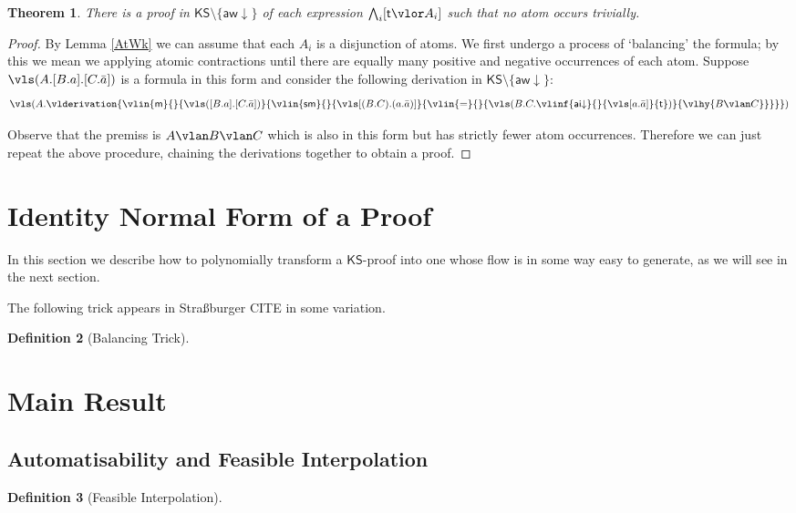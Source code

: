 \documentclass[a4paper]{amsart}
\newtheorem{theorem}{Theorem}
\theoremstyle{definition}
\newtheorem{definition}[theorem]{Definition}
\newcommand{\ttt}{\mathsf t}
\newcommand{\ai  }{\mathsf{ai}}
\newcommand{\aw  }{\mathsf{aw}}
\newcommand{\aid }{{\ai{\downarrow}}}
\newcommand{\awd }{{\aw{\downarrow}}}
\newcommand{\med }{\mathsf{m}}
\newcommand{\smix }{\mathsf{sm}}
\newcommand{\KS}{\mathsf{KS}}
\begin{document}
\begin{theorem}
There is a proof in $\KS\setminus\{\awd\}$ of each expression $\bigwedge_i [\ttt \vlor A_i ]$ such that no atom occurs trivially.
\end{theorem}

\begin{proof}
By Lemma \ref{AtWk} we can assume that each $A_i$ is a disjunction of atoms. We first undergo a process of `balancing' the formula; by this we mean we applying atomic contractions until there are equally many positive and negative occurrences of each atom. Suppose $\vls(A.[B.a].[C.\bar{a}])$ is a formula in this form and consider the following derivation in $\KS\setminus\{\awd\}$:
\[
\vls(A.
\vlderivation{
\vlin{\med}{}{\vls([B.a].[C.\bar{a}])}{
\vlin{\smix}{}{\vls[(B.C).(a.\bar{a})]}{
\vlin{=}{}{\vls(B.C.\vlinf{\aid}{}{\vls[a.\bar{a}]}{\ttt})}{\vlhy{B\vlan C}}
}
}
}
)
\]

Observe that the premiss is $A\vlan B\vlan C$ which is also in this form but has strictly fewer atom occurrences. Therefore we can just repeat the above procedure, chaining the derivations together to obtain a proof.
\end{proof}

\section{Identity Normal Form of a Proof}
In this section we describe how to polynomially transform a $\KS$-proof into one whose flow is in some way easy to generate, as we will see in the next section.

The following trick appears in Stra\ss burger CITE in some variation.

\begin{definition}[Balancing Trick]

\end{definition}

\section{Main Result}

\subsection{Automatisability and Feasible Interpolation}

\begin{definition}[Feasible Interpolation]

\end{definition}
\end{document}
